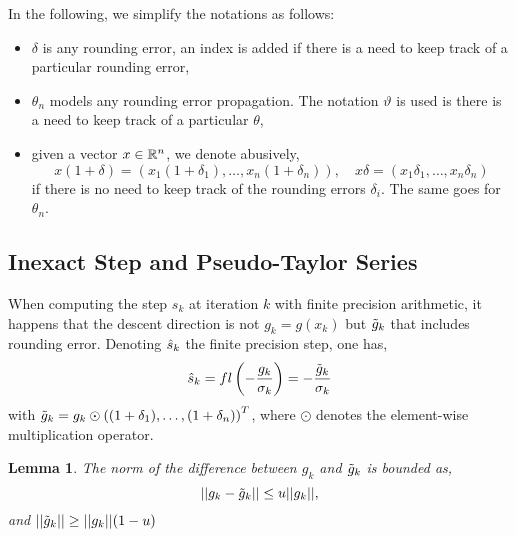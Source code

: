 \documentclass{article}[12pt]
\newtheorem{lemma}[]{Lemma}
\begin{document}
	In the following, we simplify the notations as follows:
	\begin{itemize}
		\item $\delta$ is any rounding error, an index is added if there is a need to keep track of a particular rounding error,
		\item $\theta_n$ models any rounding error propagation. The notation $\vartheta$ is used is there is a need to keep track of a particular $\theta$,
		\item given a vector $x\in \mathbb{R}^n$, we denote abusively,
		\begin{equation*}
			x(1+\delta) = (x_1(1+\delta_1),\dots,x_n(1+\delta_n)),\quad
			x\delta = (x_1\delta_1,\dots,x_n\delta_n)
		\end{equation*} if there is no need to keep track of the rounding errors $\delta_i$. The same goes for $\theta_n$.
	\end{itemize}
	
	
	\subsection{Inexact Step and Pseudo-Taylor Series}
	
	When computing the step $s_k$ at iteration $k$ with finite precision arithmetic, it happens that the descent direction is not $g_k = g(x_k)$ but $\tilde{g}_k$ that includes rounding error. Denoting $\hat{s}_{k}$ the finite precision step, one has,
	\begin{equation}
		\label{eq:sk_exp}
		\hat{s}_{k} = fl\left(-\dfrac{g_k}{\sigma_k}\right) = -\dfrac{\tilde{g}_k}{\sigma_k}
	\end{equation}
	with $\tilde{g}_k = g_k\odot\left((1+\delta_1),\dots,(1+\delta_n)\right)^T$, where $\odot$ denotes the element-wise multiplication operator.
	
	\begin{lemma}
		\label{lem:g_actual_diff}
		The norm of the difference between $g_k$ and $\tilde{g}_k$ is bounded as,
		\begin{equation}
			\label{eq:g_gd_norm_diff}
			||g_k-\tilde{g}_k|| \leq u||g_k||,
		\end{equation}
	and $||\tilde{g}_k|| \geq ||g_k||(1-u)$
	\end{lemma} 
\end{document}
